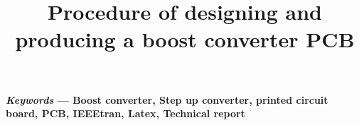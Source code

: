\documentclass[conference]{IEEEtran}
\begin{document}

\title{Procedure of designing and producing a boost converter PCB}
\author{
 }
\maketitle

%

\textbf{\textit{Keywords} --- Boost converter, Step up converter, printed circuit board, PCB, IEEEtran, Latex, Technical report}












\end{document}
